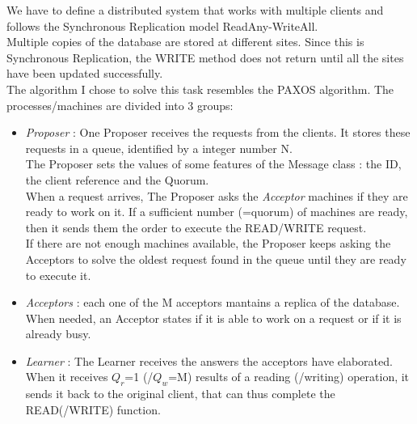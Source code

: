 \documentclass[paper=a4, fontsize=11pt]{scrartcl} %
\numberwithin{equation}{section} %
\numberwithin{figure}{section} %
\numberwithin{table}{section} %
\begin{document}
We have to define a distributed system that works with multiple clients and follows the Synchronous Replication model ReadAny-WriteAll.\\
Multiple copies of the database are stored at different sites. Since this is Synchronous Replication, the WRITE method does not return until all the sites have been updated successfully.
~\\
The algorithm I chose to solve this task resembles the PAXOS algorithm. The processes/machines are divided into 3 groups:\\
\begin{itemize}
\item \textit{Proposer} : One Proposer receives the requests from the clients. It stores these requests in a queue, identified by a integer number N. \\
The Proposer sets the values of some features of the Message class : the ID, the client reference and the Quorum.\\
When a request arrives, The Proposer asks the \textit{Acceptor} machines if they are ready to work on it. If a sufficient number (=quorum) of machines are ready, then it sends them the order to execute the READ/WRITE request.\\
If there are not enough machines available, the Proposer keeps asking the Acceptors to solve the oldest request found in the queue until they are ready to execute it.
\item \textit{Acceptors} : each one of the M acceptors mantains a replica of the database. When needed, an Acceptor states if it is able to work on a request or if it is already busy. 
\item \textit{Learner} : The Learner receives the answers the acceptors have elaborated. When it receives $Q_r$=1 (/$Q_w$=M)  results of a reading (/writing) operation, it sends it back to the original client, that can thus complete the READ(/WRITE) function. 
\end{itemize}
\end{document}
